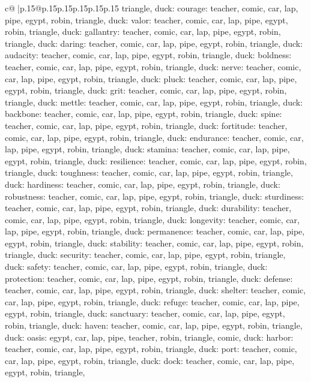 \documentclass{article}
\begin{document}
{\begin{supertabular}{c@{$\;$}|p{.15\linewidth}@{}p{.15\linewidth}p{.15\linewidth}p{.15\linewidth}p{.15\linewidth}p{.15\linewidth}}
{{{triangle, duck\n\nCLUE: courage\nTARGETS: teacher, comic, car, lap, pipe, egypt, robin, triangle, duck\n\nCLUE: valor\nTARGETS: teacher, comic, car, lap, pipe, egypt, robin, triangle, duck\n\nCLUE: gallantry\nTARGETS: teacher, comic, car, lap, pipe, egypt, robin, triangle, duck\n\nCLUE: daring\nTARGETS: teacher, comic, car, lap, pipe, egypt, robin, triangle, duck\n\nCLUE: audacity\nTARGETS: teacher, comic, car, lap, pipe, egypt, robin, triangle, duck\n\nCLUE: boldness\nTARGETS: teacher, comic, car, lap, pipe, egypt, robin, triangle, duck\n\nCLUE: nerve\nTARGETS: teacher, comic, car, lap, pipe, egypt, robin, triangle, duck\n\nCLUE: pluck\nTARGETS: teacher, comic, car, lap, pipe, egypt, robin, triangle, duck\n\nCLUE: grit\nTARGETS: teacher, comic, car, lap, pipe, egypt, robin, triangle, duck\n\nCLUE: mettle\nTARGETS: teacher, comic, car, lap, pipe, egypt, robin, triangle, duck\n\nCLUE: backbone\nTARGETS: teacher, comic, car, lap, pipe, egypt, robin, triangle, duck\n\nCLUE: spine\nTARGETS: teacher, comic, car, lap, pipe, egypt, robin, triangle, duck\n\nCLUE: fortitude\nTARGETS: teacher, comic, car, lap, pipe, egypt, robin, triangle, duck\n\nCLUE: endurance\nTARGETS: teacher, comic, car, lap, pipe, egypt, robin, triangle, duck\n\nCLUE: stamina\nTARGETS: teacher, comic, car, lap, pipe, egypt, robin, triangle, duck\n\nCLUE: resilience\nTARGETS: teacher, comic, car, lap, pipe, egypt, robin, triangle, duck\n\nCLUE: toughness\nTARGETS: teacher, comic, car, lap, pipe, egypt, robin, triangle, duck\n\nCLUE: hardiness\nTARGETS: teacher, comic, car, lap, pipe, egypt, robin, triangle, duck\n\nCLUE: robustness\nTARGETS: teacher, comic, car, lap, pipe, egypt, robin, triangle, duck\n\nCLUE: sturdiness\nTARGETS: teacher, comic, car, lap, pipe, egypt, robin, triangle, duck\n\nCLUE: durability\nTARGETS: teacher, comic, car, lap, pipe, egypt, robin, triangle, duck\n\nCLUE: longevity\nTARGETS: teacher, comic, car, lap, pipe, egypt, robin, triangle, duck\n\nCLUE: permanence\nTARGETS: teacher, comic, car, lap, pipe, egypt, robin, triangle, duck\n\nCLUE: stability\nTARGETS: teacher, comic, car, lap, pipe, egypt, robin, triangle, duck\n\nCLUE: security\nTARGETS: teacher, comic, car, lap, pipe, egypt, robin, triangle, duck\n\nCLUE: safety\nTARGETS: teacher, comic, car, lap, pipe, egypt, robin, triangle, duck\n\nCLUE: protection\nTARGETS: teacher, comic, car, lap, pipe, egypt, robin, triangle, duck\n\nCLUE: defense\nTARGETS: teacher, comic, car, lap, pipe, egypt, robin, triangle, duck\n\nCLUE: shelter\nTARGETS: teacher, comic, car, lap, pipe, egypt, robin, triangle, duck\n\nCLUE: refuge\nTARGETS: teacher, comic, car, lap, pipe, egypt, robin, triangle, duck\n\nCLUE: sanctuary\nTARGETS: teacher, comic, car, lap, pipe, egypt, robin, triangle, duck\n\nCLUE: haven\nTARGETS: teacher, comic, car, lap, pipe, egypt, robin, triangle, duck\n\nCLUE: oasis\nTARGETS: egypt, car, lap, pipe, teacher, robin, triangle, comic, duck\n\nCLUE: harbor\nTARGETS: teacher, comic, car, lap, pipe, egypt, robin, triangle, duck\n\nCLUE: port\nTARGETS: teacher, comic, car, lap, pipe, egypt, robin, triangle, duck\n\nCLUE: dock\nTARGETS: teacher, comic, car, lap, pipe, egypt, robin, triangle, }}}
\end{supertabular}}
\end{document}
